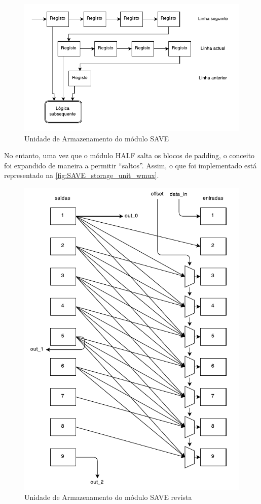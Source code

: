 \documentclass[a4paper]{article}
\begin{document}
\begin{figure}[h]
	\centering
	\includegraphics[width=0.8\linewidth]{SAVE_storageunit_1}
	\caption{Unidade de Armazenamento do módulo SAVE}
	\label{fig:SAVE_storageunit_1}
\end{figure}

No entanto, uma vez que o módulo HALF salta os blocos de padding, o conceito foi expandido de maneira a permitir ``saltos''. Assim, o que foi implementado está representado na \autoref{fig:SAVE_storage_unit_wmux}.

\begin{figure}[h]
	\centering
	\includegraphics[width=0.8\linewidth]{SAVE_storage_unit_wmux}
	\caption{Unidade de Armazenamento do módulo SAVE revista}
	\label{fig:SAVE_storage_unit_wmux}
\end{figure}
\end{document}
